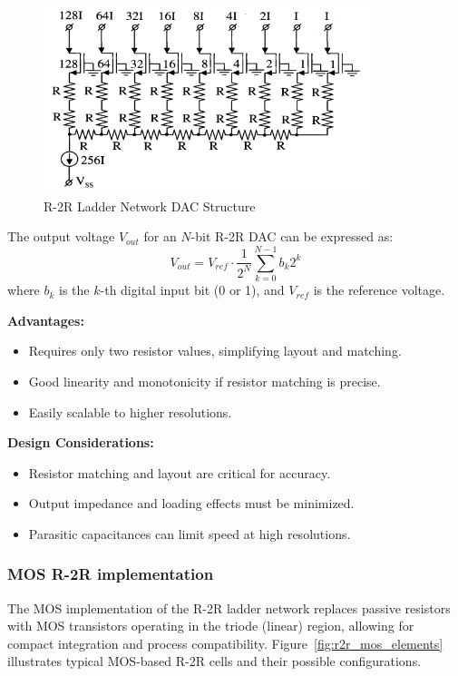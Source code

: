     \begin{figure}[h]
        \centering
        \includegraphics[width=0.85\textwidth]{figs/r2r_ladder.png}
        \caption{R-2R Ladder Network DAC Structure}
        \label{fig:r2r_ladder}
    \end{figure}

    The output voltage $V_{out}$ for an $N$-bit R-2R DAC can be expressed as:
    \begin{equation}
        V_{out} = V_{ref} \cdot \frac{1}{2^N} \sum_{k=0}^{N-1} b_k 2^{k}
    \end{equation}
    where $b_k$ is the $k$-th digital input bit (0 or 1), and $V_{ref}$ is the reference voltage.

    \textbf{Advantages:}
    \begin{itemize}
        \item Requires only two resistor values, simplifying layout and matching.
        \item Good linearity and monotonicity if resistor matching is precise.
        \item Easily scalable to higher resolutions.
    \end{itemize}

    \textbf{Design Considerations:}
    \begin{itemize}
        \item Resistor matching and layout are critical for accuracy.
        \item Output impedance and loading effects must be minimized.
        \item Parasitic capacitances can limit speed at high resolutions.
    \end{itemize}
    \subsubsection{MOS R-2R implementation}
    The MOS implementation of the R-2R ladder network replaces passive resistors with MOS transistors operating in the triode (linear) region, allowing for compact integration and process compatibility. Figure~\ref{fig:r2r_mos_elements} illustrates typical MOS-based R-2R cells and their possible configurations.

